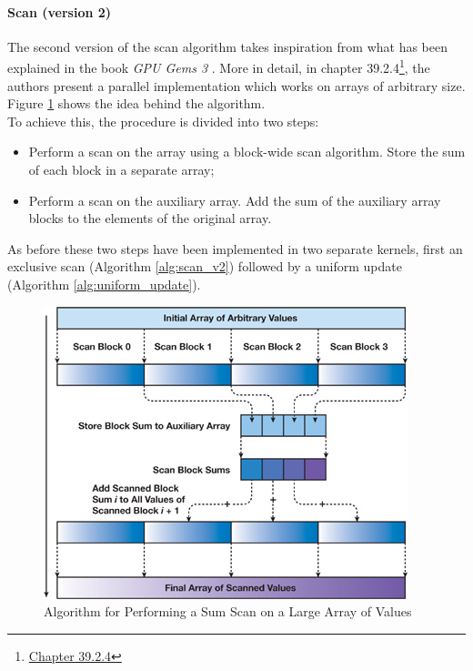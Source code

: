 \documentclass{IEEEconf}
\begin{document}
\paragraph{Scan (version 2)}
The second version of the scan algorithm takes inspiration from what has been explained in the book \textit{GPU Gems 3} \cite{nvidia:gpu_gems_3}.
More in detail, in chapter 39.2.4\footnote{\href{https://developer.nvidia.com/gpugems/gpugems3/part-vi-gpu-computing/chapter-39-parallel-prefix-sum-scan-cuda}{Chapter 39.2.4}},
the authors present a parallel implementation which works on arrays of arbitrary size.
Figure \ref{fig:scan_la} shows the idea behind the algorithm. \\
To achieve this, the procedure is divided into two steps:
\begin{itemize}
    \item Perform a scan on the array using a block-wide scan algorithm. Store the sum of each block in a separate array;
    \item Perform a scan on the auxiliary array. Add the sum of the auxiliary array blocks to the elements of the original array.
\end{itemize}
As before these two steps have been implemented in two separate kernels, first an exclusive scan (Algorithm \ref{alg:scan_v2})
followed by a uniform update (Algorithm \ref{alg:uniform_update}).
\begin{figure}
    \includegraphics[width=\columnwidth]{images/scan_la.jpg}
    \caption{Algorithm for Performing a Sum Scan on a Large Array of Values}
    \label{fig:scan_la}
\end{figure}
\end{document}
